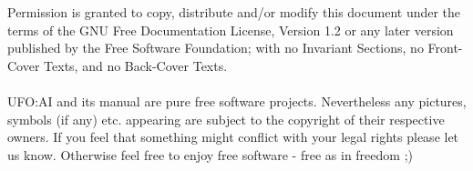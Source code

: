 



Permission is granted to copy, distribute and/or modify this document under the terms of the GNU Free Documentation License, Version 1.2 or any later version published by the Free Software Foundation; with no Invariant Sections, no Front-Cover Texts, and no Back-Cover Texts.\\
\\
UFO:AI and its manual are pure free software projects. Nevertheless any pictures, symbols (if any) etc. appearing are subject to the copyright of their respective owners. If you feel that something might conflict with your legal rights please let us know. Otherwise feel free to enjoy free software - free as in freedom ;) 

\maketitle
\newpage
\tableofcontents






\appendix



